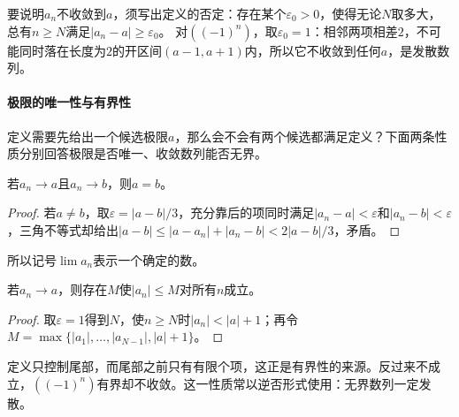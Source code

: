 要说明$a_n$不收敛到$a$，须写出定义的否定：存在某个$\varepsilon_0>0$，使得无论$N$取多大，总有$n\geq N$满足$|a_n-a|\geq\varepsilon_0$。
对$((-1)^n)$，取$\varepsilon_0=1$：相邻两项相差$2$，不可能同时落在长度为$2$的开区间$(a-1,a+1)$内，所以它不收敛到任何$a$，是发散数列。

\paragraph{极限的唯一性与有界性}
定义需要先给出一个候选极限$a$，那么会不会有两个候选都满足定义？下面两条性质分别回答极限是否唯一、收敛数列能否无界。
\begin{theorem}[极限的唯一性]
\label{thm:ru-limit-uniqueness}
若$a_n\to a$且$a_n\to b$，则$a=b$。
\end{theorem}
\begin{proof}
若$a\neq b$，取$\varepsilon=|a-b|/3$，充分靠后的项同时满足$|a_n-a|<\varepsilon$和$|a_n-b|<\varepsilon$，三角不等式却给出$|a-b|\leq|a-a_n|+|a_n-b|<2|a-b|/3$，矛盾。
\end{proof}
所以记号$\lim a_n$表示一个确定的数。

\begin{theorem}[收敛数列的有界性]
\label{thm:ru-convergent-bounded}
若$a_n\to a$，则存在$M$使$|a_n|\leq M$对所有$n$成立。
\end{theorem}
\begin{proof}
取$\varepsilon=1$得到$N$，使$n\geq N$时$|a_n|<|a|+1$；再令$M=\max\{|a_1|,\ldots,|a_{N-1}|,|a|+1\}$。
\end{proof}
定义只控制尾部，而尾部之前只有有限个项，这正是有界性的来源。反过来不成立，$((-1)^n)$有界却不收敛。这一性质常以逆否形式使用：无界数列一定发散。

